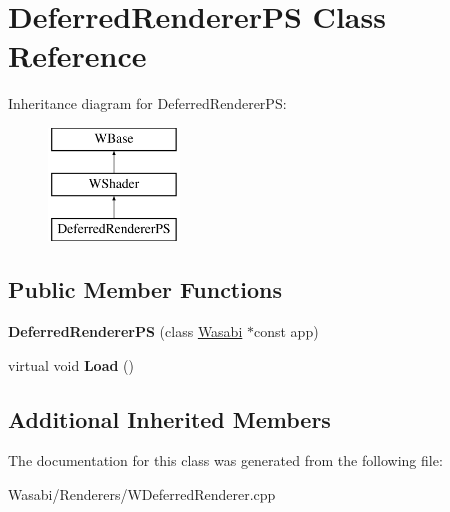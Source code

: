 \hypertarget{class_deferred_renderer_p_s}{}\section{Deferred\+Renderer\+PS Class Reference}
\label{class_deferred_renderer_p_s}
Inheritance diagram for Deferred\+Renderer\+PS\+:\begin{figure}[H]
\begin{center}
\leavevmode
\includegraphics[height=3.000000cm]{class_deferred_renderer_p_s}
\end{center}
\end{figure}
\subsection*{Public Member Functions}
\begin{DoxyCompactItemize}
\item 
{\bfseries Deferred\+Renderer\+PS} (class \hyperlink{class_wasabi}{Wasabi} $\ast$const app)\hypertarget{class_deferred_renderer_p_s_ac0ca5a1f3051a866067132a435e73968}{}\label{class_deferred_renderer_p_s_ac0ca5a1f3051a866067132a435e73968}

\item 
virtual void {\bfseries Load} ()\hypertarget{class_deferred_renderer_p_s_af8c4e8d25a9d77dbaff0dfb45d6dfb07}{}\label{class_deferred_renderer_p_s_af8c4e8d25a9d77dbaff0dfb45d6dfb07}

\end{DoxyCompactItemize}
\subsection*{Additional Inherited Members}


The documentation for this class was generated from the following file\+:\begin{DoxyCompactItemize}
\item 
Wasabi/\+Renderers/W\+Deferred\+Renderer.\+cpp\end{DoxyCompactItemize}
